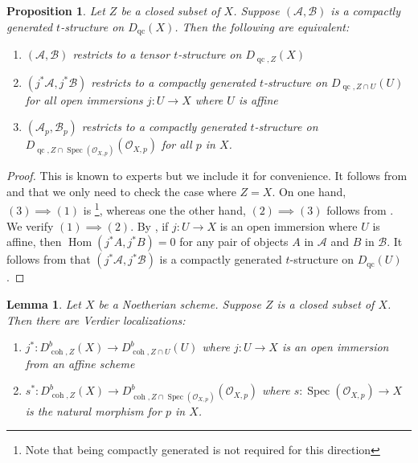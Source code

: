 \documentclass[11pt]{amsart}
\theoremstyle{plain}
\newtheorem{lemma}[theorem]{Lemma}
\newtheorem{proposition}[theorem]{Proposition}
\theoremstyle{definition}
\numberwithin{equation}{section}
\numberwithin{theorem}{section}
\begin{document}
\begin{proposition}\label{prop:tensor_compatible_local_to_global}
    Let $Z$ be a closed subset of $X$. Suppose $(\mathcal{A},\mathcal{B})$ is a compactly generated $t$-structure on $D_{\operatorname{qc}}(X)$. Then the following are equivalent:
    \begin{enumerate}
        \item $(\mathcal{A},\mathcal{B})$ restricts to a tensor $t$-structure on $D_{\operatorname{qc},Z}(X)$
        \item $(j^\ast \mathcal{A}, j^\ast \mathcal{B})$ restricts to a compactly generated $t$-structure on $D_{\operatorname{qc},Z\cap U}(U)$ for all open immersions $j \colon U \to X$ where $U$ is affine
        \item $(\mathcal{A}_p,\mathcal{B}_p)$ restricts to a compactly generated $t$-structure on $D_{\operatorname{qc},Z\cap \operatorname{Spec}(\mathcal{O}_{X,p})}(\mathcal{O}_{X,p})$ for all $p$ in $X$.
    \end{enumerate}
\end{proposition}

\begin{proof}
    This is known to experts but we include it for convenience. It follows from  and  that we only need to check the case where $Z=X$. On one hand, $(3)\implies (1)$ is \footnote{Note that being compactly generated is not required for this direction}, whereas one the other hand,  $(2)\implies (3)$ follows from \cite[Proposition 2.9 \& Theorem 3.10]{AlonsoTarrio/JeremiasLopez/Saorin:2010}. We verify $(1)\implies (2)$. By \cite[Proposition 3.5]{Lank:2025}, if $j \colon U \to X$ is an open immersion where $U$ is affine, then $\operatorname{Hom}(j^\ast A, j^\ast B)=0$ for any pair of objects $A$ in $\mathcal{A}$ and $B$ in $\mathcal{B}$. It follows from  that $(j^\ast \mathcal{A}, j^\ast \mathcal{B})$ is a compactly generated $t$-structure on $D_{\operatorname{qc}}(U)$.
\end{proof}

\begin{lemma}\label{lem:relative_d^b_coh_verdier_localization}
    Let $X$ be a Noetherian scheme. Suppose $Z$ is a closed subset of $X$. Then there are Verdier localizations:
    \begin{enumerate}
        \item $j^\ast \colon D^b_{\operatorname{coh},Z}(X) \to D^b_{\operatorname{coh},Z\cap U}(U)$ where $j\colon U \to X$ is an open immersion from an affine scheme
        \item $s^\ast \colon D^b_{\operatorname{coh},Z}(X) \to D^b_{\operatorname{coh},Z\cap \operatorname{Spec}(\mathcal{O}_{X,p})}(\mathcal{O}_{X,p})$ where $s\colon \operatorname{Spec}(\mathcal{O}_{X,p}) \to X$ is the natural morphism for $p$ in $X$.
    \end{enumerate}
\end{lemma}
\end{document}
